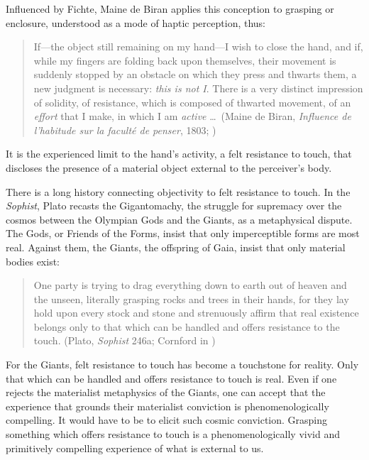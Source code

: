 Influenced by Fichte, Maine de Biran applies this conception to grasping or enclosure, understood as a mode of haptic perception, thus:
\begin{quote}
	If---the object still remaining on my hand---I wish to close the hand, and if, while my fingers are folding back upon themselves, their movement is suddenly stopped by an obstacle on which they press and thwarts them, a new judgment is necessary: \emph{this is not I}. There is a very distinct impression of solidity, of resistance, which is composed of thwarted movement, of an \emph{effort} that I make, in which I am \emph{active} \ldots\ (Maine de Biran, \emph{Influence de l'habitude sur la facult\'{e} de penser}, 1803; \citealt[57]{Boehm:1929aa})
\end{quote}
It is the experienced limit to the hand's activity, a felt resistance to touch, that discloses the presence of a material object external to the perceiver's body.

There is a long history connecting objectivity to felt resistance to touch. In the \emph{Sophist}, Plato recasts the Gigantomachy, the struggle for supremacy over the cosmos between the Olympian Gods and the Giants, as a metaphysical dispute. The Gods, or Friends of the Forms, insist that only imperceptible forms are most real. Against them, the Giants, the offspring of Gaia, insist that only material bodies exist:
\begin{quote}
	One party is trying to drag everything down to earth out of heaven and the unseen, literally grasping rocks and trees in their hands, for they lay hold upon every stock and stone and strenuously affirm that real existence belongs only to that which can be handled and offers resistance to the touch. (Plato, \emph{Sophist} 246a; Cornford in \citealt[990]{Hamilton:1989fk})
\end{quote}
For the Giants, felt resistance to touch has become a touchstone for reality. Only that which can be handled and offers resistance to touch is real. Even if one rejects the materialist metaphysics of the Giants, one can accept that the experience that grounds their materialist conviction is phenomenologically compelling. It would have to be to elicit such cosmic conviction. Grasping something which offers resistance to touch is a phenomenologically vivid and primitively compelling experience of what is external to us. 

